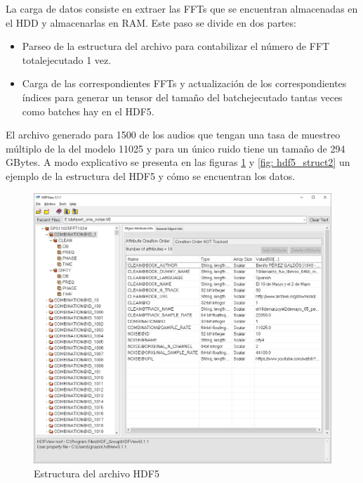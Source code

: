 La carga de datos consiste en extraer las \glspl{FFT} que se encuentran almacenadas en el \gls{HDD} y almacenarlas en \gls{RAM}. Este paso se divide en dos partes:
\begin{itemize}
	\item Parseo de la estructura del archivo para contabilizar el número de \gls{FFT} totalejecutado 1 vez.
	\item Carga de las correspondientes \glspl{FFT} y actualización de los correspondientes índices para generar un tensor del tamaño del batchejecutado tantas veces como batches hay en el \gls{HDF5}.
\end{itemize}

El archivo generado para 1500 de los audios que tengan una tasa de muestreo múltiplo de la del modelo 11025 y para un único ruido tiene un tamaño de 294 GBytes. A modo explicativo se presenta en las figuras \ref{fig: hdf5_struct} y \ref{fig: hdf5_struct2} un ejemplo de la estructura del \gls{HDF5} y cómo se encuentran los datos.

\begin{figure}[h!]
	\centering
	\includegraphics[width=0.9\columnwidth]{figures/HDF5_struct}
	\caption{Estructura del archivo \gls{HDF5}}
	\label{fig: hdf5_struct}
\end{figure}

